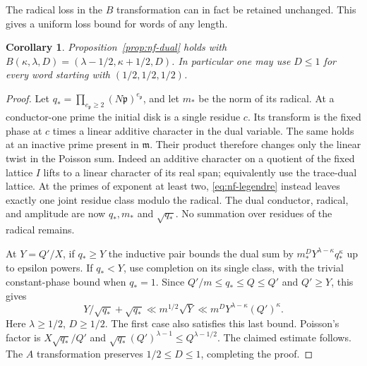 \documentclass[11pt,letterpaper]{article}
\newtheorem{corollary}[corollary]{Corollary}
\theoremstyle{definition}
\numberwithin{equation}{section}
\begin{document}
The radical loss in the $B$ transformation can in fact be retained
unchanged. This gives a uniform loss bound for words of any length.
\begin{corollary}\label{cor:nf-dual-radical}
Proposition~\ref{prop:nf-dual} holds with
$B(\kappa,\lambda,D)=(\lambda-1/2,\kappa+1/2,D)$.
In particular one may use $D\le1$ for every word starting
with $(1/2,1/2,1/2)$.
\end{corollary}
\begin{proof}
Let $q_*=\prod_{e_{\mathfrak p}\ge2}(N\mathfrak p)^{e_{\mathfrak p}}$,
and let $m_*$ be the norm of its radical. At a conductor-one prime
the initial disk is a single residue $c$. Its transform is the
fixed phase at $c$ times a linear additive character in the dual
variable. The same holds at an inactive prime present in $\mathfrak m$.
Their product therefore changes only the linear twist in the
Poisson sum. Indeed an additive character on a quotient of the
fixed lattice $I$ lifts to a linear character of its real span;
equivalently use the trace-dual lattice. At the primes of
exponent at least two, \eqref{eq:nf-legendre} instead leaves exactly
one joint residue class modulo the radical. The dual conductor,
radical, and amplitude are now $q_*,m_*$ and $\sqrt{q_*}$.
No summation over residues of the radical remains.

At $Y=Q'/X$, if $q_*\ge Y$ the inductive pair bounds the dual sum
by $m_*^D Y^{\lambda-\kappa}q_*^\kappa$ up to epsilon powers.
If $q_*<Y$, use completion on its single class, with the trivial
constant-phase bound when $q_*=1$. Since $Q'/m\le q_*\le Q\le Q'$
and $Q'\ge Y$, this gives
\[
 Y/\sqrt{q_*}+\sqrt{q_*}\ll m^{1/2}\sqrt Y
       \ll m^D Y^{\lambda-\kappa}(Q')^\kappa .
\]
Here $\lambda\ge1/2$, $D\ge1/2$. The first case also satisfies this
last bound. Poisson's factor is $X\sqrt{q_*}/Q'$ and
$\sqrt{q_*}(Q')^{\lambda-1}\le Q^{\lambda-1/2}$.
The claimed estimate follows. The $A$ transformation preserves
$1/2\le D\le1$, completing the proof.
\end{proof}
\end{document}
